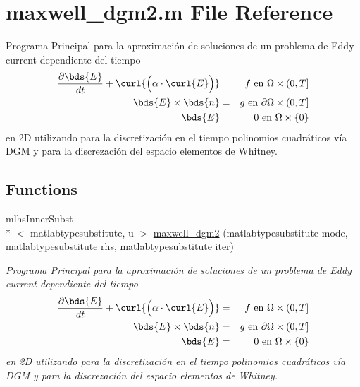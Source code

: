 \hypertarget{a00027}{\section{maxwell\-\_\-dgm2.\-m File Reference}
\label{a00027}
}


Programa Principal para la aproximación de soluciones de un problema de Eddy current dependiente del tiempo \begin{eqnarray*} \frac{ \partial \bds{E}}{dt} + \curl{\Big ( \alpha \cdot \curl{E}\Big )} &=& f \mbox{ en $\Omega \times (0,T]$}\\ \bds{E} \times \bds{n} &=& g \mbox{ en $\partial \Omega \times (0,T]$}\\ \bds{E} &=& 0 \mbox{ en $ \Omega \times \{0\}$} \end{eqnarray*} en 2\-D utilizando para la discretización en el tiempo polinomios cuadráticos vía D\-G\-M y para la discrezación del espacio elementos de Whitney.  


\subsection*{Functions}
\begin{DoxyCompactItemize}
\item 
mlhs\-Inner\-Subst\\*
$<$ matlabtypesubstitute, u $>$ \hyperlink{a00027_aa1c23ee143ed2521278ea8594b5b3e8a}{maxwell\-\_\-dgm2} (matlabtypesubstitute mode, matlabtypesubstitute rhs, matlabtypesubstitute iter)
\begin{DoxyCompactList}\small\item\em Programa Principal para la aproximación de soluciones de un problema de Eddy current dependiente del tiempo \begin{eqnarray*} \frac{ \partial \bds{E}}{dt} + \curl{\Big ( \alpha \cdot \curl{E}\Big )} &=& f \mbox{ en $\Omega \times (0,T]$}\\ \bds{E} \times \bds{n} &=& g \mbox{ en $\partial \Omega \times (0,T]$}\\ \bds{E} &=& 0 \mbox{ en $ \Omega \times \{0\}$} \end{eqnarray*} en 2\-D utilizando para la discretización en el tiempo polinomios cuadráticos vía D\-G\-M y para la discrezación del espacio elementos de Whitney. \end{DoxyCompactList}\end{DoxyCompactItemize}



